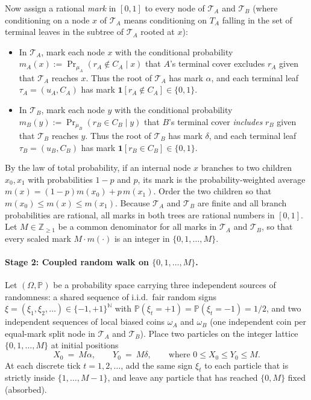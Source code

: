 \documentclass[11pt,letterpaper]{article}
\begin{document}
Now assign a rational \emph{mark} in $[0,1]$ to every node of $\mathcal T_A$ and $\mathcal T_B$ (where conditioning on a node $x$ of $\mathcal T_A$ means conditioning on $T_A$ falling in the set of terminal leaves in the subtree of $\mathcal T_A$ rooted at $x$):
\begin{itemize}
\item In $\mathcal T_A$, mark each node $x$ with the conditional probability $m_A(x) := \Pr_{\mu_A}(r_A\notin C_A\mid x)$ that $A$'s terminal cover excludes $r_A$ given that $\mathcal T_A$ reaches $x$. Thus the root of $\mathcal T_A$ has mark $\alpha$, and each terminal leaf $\tau_A=(u_A,C_A)$ has mark $\mathbf 1[r_A\notin C_A]\in\{0,1\}$.
\item In $\mathcal T_B$, mark each node $y$ with the conditional probability $m_B(y) := \Pr_{\mu_B}(r_B\in C_B\mid y)$ that $B$'s terminal cover \emph{includes} $r_B$ given that $\mathcal T_B$ reaches $y$. Thus the root of $\mathcal T_B$ has mark $\delta$, and each terminal leaf $\tau_B=(u_B,C_B)$ has mark $\mathbf 1[r_B\in C_B]\in\{0,1\}$.
\end{itemize}
By the law of total probability, if an internal node $x$ branches to two children $x_0,x_1$ with probabilities $1-p$ and $p$, its mark is the probability-weighted average $m(x) = (1-p)m(x_0) + p\,m(x_1)$. Order the two children so that $m(x_0)\le m(x)\le m(x_1)$. Because $\mathcal T_A$ and $\mathcal T_B$ are finite and all branch probabilities are rational, all marks in both trees are rational numbers in $[0,1]$. Let $M\in\mathbb Z_{\ge 1}$ be a common denominator for all marks in $\mathcal T_A$ and $\mathcal T_B$, so that every scaled mark $M\cdot m(\cdot)$ is an integer in $\{0,1,\ldots,M\}$.

\paragraph{Stage 2: Coupled random walk on $\{0,1,\ldots,M\}$.}
Let $(\Omega,\mathbb P)$ be a probability space carrying three independent sources of randomness: a shared sequence of i.i.d.\ fair random signs $\xi = (\xi_1,\xi_2,\ldots)\in\{-1,+1\}^{\mathbb N}$ with $\mathbb P(\xi_t=+1)=\mathbb P(\xi_t=-1)=1/2$, and two independent sequences of local biased coins $\omega_A$ and $\omega_B$ (one independent coin per equal-mark split node in $\mathcal T_A$ and $\mathcal T_B$). Place two particles on the integer lattice $\{0,1,\ldots,M\}$ at initial positions
\[
  X_0\ =\ M\alpha,\qquad Y_0\ =\ M\delta,\qquad\text{where } 0\le X_0\le Y_0\le M.
\]
At each discrete tick $t=1,2,\ldots$, add the same sign $\xi_t$ to each particle that is strictly inside $\{1,\ldots,M-1\}$, and leave any particle that has reached $\{0,M\}$ fixed (absorbed).
\end{document}
